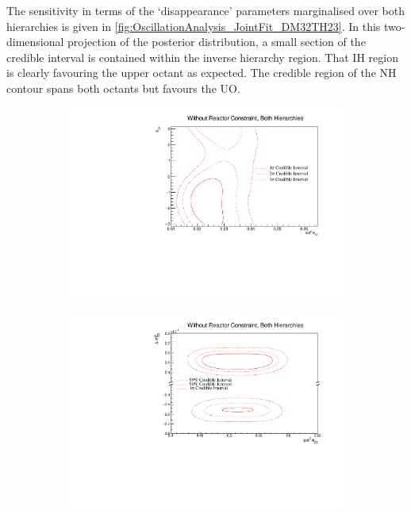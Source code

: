 The sensitivity in terms of the `disappearance' parameters marginalised over both hierarchies is given in \autoref{fig:OscillationAnalysis_JointFit_DM32TH23}. In this two-dimensional projection of the posterior distribution, a small section of the \quickmath{1\sigma} credible interval is contained within the inverse hierarchy region. That IH region is clearly favouring the upper octant as expected. The \quickmath{1\sigma} credible region of the NH contour spans both octants but favours the UO.

\begin{figure}[h]
  \begin{subfigure}[t]{0.95\textwidth}
    \includegraphics[width=\textwidth, trim={0mm 0mm 0mm 0mm}, clip,page=1]{Figures/OA/JointFit/Contours_2D_th13_dcp_BH_1_woRC_UnSmeared_CredibleInterval.pdf}
  \end{subfigure}
  \caption{}
  \label{fig:OscillationAnalysis_JointFit_DCPTH13}
\end{figure}

\begin{figure}[h]
  \begin{subfigure}[t]{0.95\textwidth}
    \includegraphics[width=\textwidth, trim={0mm 0mm 0mm 0mm}, clip,page=1]{Figures/OA/JointFit/Contours_2D_th23_dm32_BH_0_woRC_UnSmeared_CredibleInterval.pdf}
  \end{subfigure}
  \caption{}
  \label{fig:OscillationAnalysis_JointFit_DM32TH23}
\end{figure}


